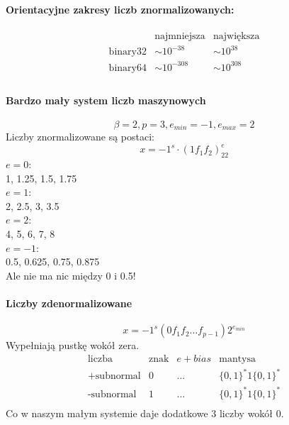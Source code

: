 \documentclass{article}
\begin{document}
\paragraph{Orientacyjne zakresy liczb znormalizowanych:}
$$\begin{matrix}
&\text{najmniejsza}&\text{największa}\\
\text{binary32}&\sim10^{-38}&\sim10^{38}\\
\text{binary64}&\sim10^{-308}&\sim10^{308}\\
\end{matrix}$$

\paragraph{Bardzo mały system liczb maszynowych}
$$ \beta=2, p=3, e_{min}=-1, e_{max} =2$$
Liczby znormalizowane są postaci:
$$ x=-1^s\cdot(1f_1f_2)_22^e $$
$e=0$:\\
1, 1.25, 1.5, 1.75\\
$e=1$:\\
2, 2.5, 3, 3.5\\
$e=2$:\\
4, 5, 6, 7, 8\\
$e=-1$:\\
0.5, 0.625, 0.75, 0.875\\

Ale nie ma nic między 0 i 0.5!
\paragraph{Liczby zdenormalizowane}
$$x=-1^s(0f_1f_2\ldots f_{p-1})2^{e_{min}}$$
Wypełniają pustkę wokół zera.
$$
\begin{matrix}
\text{liczba}&\text{znak}&e+bias&\text{mantysa}\\
\text{+subnormal}&0&\ldots&\{0,1\}^*1\{0,1\}^*\\
\text{-subnormal}&1&\ldots&\{0,1\}^*1\{0,1\}^*\\
\end{matrix}
$$
Co w naszym małym systemie daje dodatkowe 3 liczby wokół 0.
\end{document}
